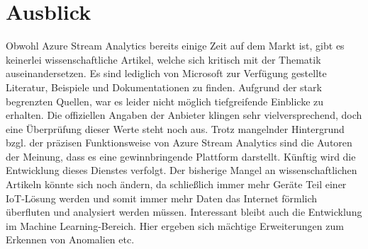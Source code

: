 \section{Ausblick}
Obwohl Azure Stream Analytics bereits einige Zeit auf dem Markt ist, gibt es keinerlei wissenschaftliche Artikel, welche sich kritisch mit der Thematik auseinandersetzen. Es sind lediglich von Microsoft zur Verfügung gestellte Literatur, Beispiele und Dokumentationen zu finden. Aufgrund der stark begrenzten Quellen, war es leider nicht möglich tiefgreifende Einblicke zu erhalten. Die offiziellen Angaben der Anbieter klingen sehr vielversprechend, doch eine Überprüfung dieser Werte steht noch aus. Trotz mangelnder Hintergrund bzgl. der präzisen Funktionsweise von Azure Stream Analytics sind die Autoren der Meinung, dass es eine gewinnbringende Plattform darstellt.
Künftig wird die Entwicklung dieses Dienstes verfolgt. Der bisherige Mangel an wissenschaftlichen Artikeln könnte sich noch ändern, da schließlich immer mehr Geräte Teil einer IoT-Lösung werden und somit immer mehr Daten das Internet förmlich überfluten und analysiert werden müssen. Interessant bleibt auch die Entwicklung im Machine Learning-Bereich. Hier ergeben sich mächtige Erweiterungen zum Erkennen von Anomalien etc.\\




\ifCLASSOPTIONcaptionsoff
  \newpage
\fi